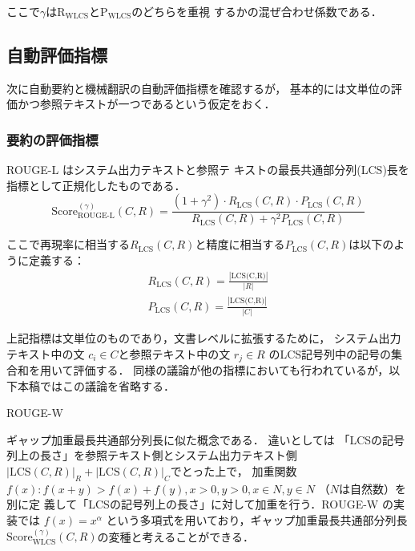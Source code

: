 \documentclass[japanese]{jnlp_1.4}
\renewcommand{\paragraph}{}
\newcommand{\modified}[1]{}
\begin{document}
ここで$\gamma$は$\mbox{R}_{\mbox{WLCS}}$と$\mbox{P}_{\mbox{WLCS}}$のどちらを重視
するかの混ぜ合わせ係数である．


\subsection{自動評価指標}

次に自動要約と機械翻訳の自動評価指標を確認するが，
基本的には文単位の評価かつ参照テキストが一つであるという仮定をおく．


\subsubsection{要約の評価指標}

ROUGE-L \cite{Lin-2004-WSTS}は\modified{，}システム出力テキストと参照テ
キストの最長共通部分列(LCS)長を指標として正規化したものである．
\[
\mbox{Score}^{(\gamma)}_{\mbox{ROUGE-L}}(C,R) = \frac{(1+\gamma^{2})\cdot R_{\mbox{LCS}}(C,R)\cdot  P_{\mbox{LCS}}(C,R)}{R_{\mbox{LCS}}(C,R)+\gamma^{2}P_{\mbox{LCS}}(C,R)} 
\]

ここで再現率に相当する$R_{\mbox{LCS}}(C,R)$と精度に相当する$P_{\mbox{LCS}}(C,R)$は以下のように定義する：
 \begin{gather*}
  R_{\mbox{LCS}}(C,R) = \frac{\displaystyle |\mbox{LCS(C,R)}|}{|R|} \\[1ex]
  P_{\mbox{LCS}}(C,R) = \frac{\displaystyle |\mbox{LCS(C,R)}|}{|C|}
 \end{gather*}

 上記指標は文単位のものであり，文書レベルに拡張するために，
システム出力テキスト中の文 $c_{i}\in C$と参照テキスト中の文 $r_{j} \in R$ のLCS記号列中の記号の集合和を用いて評価する．
 同様の議論が他の指標においても行われているが，以下本稿ではこの議論を省略する．


\paragraph{ROUGE-W}
\label{para:ROUGE-W}

\modified{ROUGE-W \cite{Lin-2004-WSTS}は，}
 ギャップ加重最長共通部分列長に似た概念である．
 違いとしては
 「LCSの記号列上の長さ」を参照テキスト側とシステム出力テキスト側
 $|\mbox{LCS}(C,R)|_{R}+|\mbox{LCS}(C,R)|_{C}$でとった上で，
 加重関数 $f(x):f(x+y)>f(x)+f(y),x>0,y>0, x\in N, y \in N$ （$N$は自然数）を別に定
\pagebreak
 義して「LCSの記号列上の長さ」に対して加重を行う．ROUGE-W の実装では $f(x) =
 x^{\alpha}$ という多項式を用いており，ギャップ加重最長共通部分列長
 $\mbox{Score}^{(\gamma)}_{\mbox{WLCS}}(C,R)$の変種と考えることができる．
 
\end{document}
